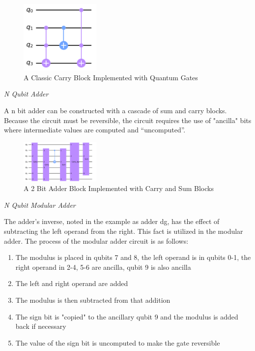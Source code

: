 \documentclass[journal]{IEEEtran}
\begin{document}
\begin{figure}[H]
    \begin{center}
        \includegraphics[width=0.35\textwidth]{Carry.png}
        \caption{\label{fig:Carry} A Classic Carry Block Implemented with Quantum Gates}
    \end{center}
\end{figure}

\emph{N Qubit Adder}

A n bit adder can be constructed with a cascade of sum and carry blocks. Because
the circuit must be reversible, the circuit requires the use of "ancilla" bits
where intermediate values are computed and ``uncomputed''.

\begin{figure}[H]
    \begin{center}
        \includegraphics[width=0.35\textwidth]{Adder.png}
        \caption{\label{fig:Adder} A 2 Bit Adder Block Implemented with Carry and Sum Blocks }
    \end{center}
\end{figure}

\emph{N Qubit Modular Adder}

The adder's inverse, noted in the example as adder dg, has the effect of
subtracting the left operand from the right. This fact is utilized in the
modular adder.  The process of the modular adder circuit is as follows:

\begin{enumerate}
    \item The modulus is placed in qubits 7 and 8, the left operand is in qubits 0-1, the right operand in 2-4, 5-6 are ancilla, qubit 9  is also ancilla
    \item The left and right operand are added
    \item The modulus is then subtracted from that addition
    \item The sign bit is "copied" to the ancillary qubit 9 and the modulus is added back if necessary
    \item The value of the sign bit is uncomputed to make the gate reversible
\end{enumerate}
\end{document}
